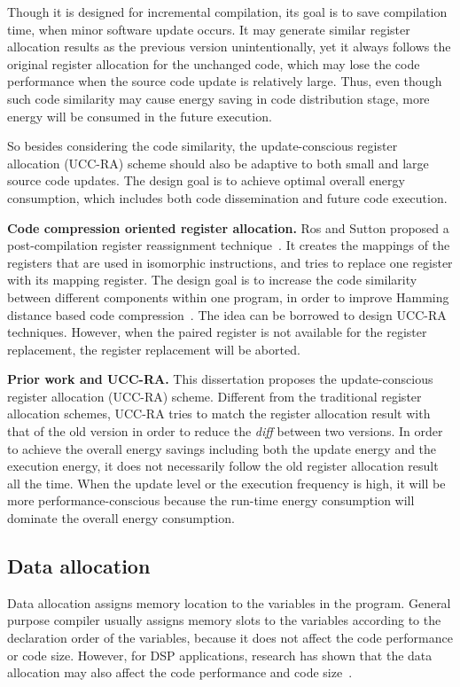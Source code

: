 Though it is designed for incremental compilation, its goal is to save compilation time, when minor software update occurs. It may generate similar register allocation results as the previous version unintentionally, yet it always follows the original register allocation for the unchanged code, which may lose the code performance when the source code update is relatively large. Thus, even though such code similarity may cause energy saving in code distribution stage, more energy will be consumed in the future execution.

So besides considering the code similarity, the update-conscious register allocation (UCC-RA) scheme should also be adaptive to both small and large source code updates. The design goal is to achieve optimal overall energy consumption, which includes both code dissemination and future code execution. 	

\textbf{Code compression oriented register allocation.}
Ros and Sutton proposed a post-compilation register reassignment technique~\cite{related:register-reassignment}. It creates the mappings of the registers that are used in isomorphic instructions, and tries to replace one register with its mapping register. The design goal is to increase the code similarity between different components within one program, in order to improve Hamming distance based code compression~\cite{hamming-compress}. 
The idea can be borrowed to design UCC-RA techniques. However, when the paired register is not available for the register replacement, the register replacement will be aborted. 

\textbf{Prior work and UCC-RA.}
This dissertation proposes the update-conscious register allocation (UCC-RA) scheme.
Different from the traditional register allocation schemes, UCC-RA tries to match the register allocation result with that of the old version in order to reduce the {\it diff} between two versions.
In order to achieve the overall energy savings including both the update energy and the execution energy, it does not necessarily follow the old register allocation result all the time. When the update level or the execution frequency is high, it will be more performance-conscious because the run-time energy consumption will dominate the overall energy consumption.


\subsection{Data allocation}
Data allocation assigns memory location to the variables in the program. General purpose compiler usually assigns memory slots to the variables according to the declaration order of the variables, because it does not affect the code performance or code size. However, for DSP applications, research has shown that the data allocation may also affect the code performance and code size~\cite{related:liao, related:bartley}.

